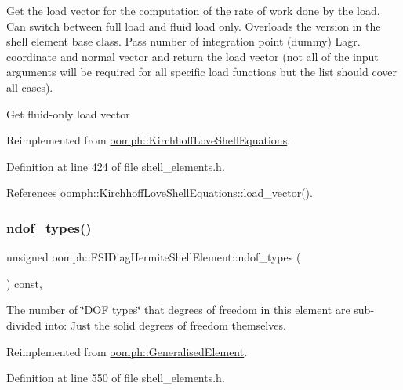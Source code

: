 Get the load vector for the computation of the rate of work done by the load. Can switch between full load and fluid load only. Overloads the version in the shell element base class. Pass number of integration point (dummy) Lagr. coordinate and normal vector and return the load vector (not all of the input arguments will be required for all specific load functions but the list should cover all cases). 

Get fluid-\/only load vector 

Reimplemented from \hyperlink{classoomph_1_1KirchhoffLoveShellEquations_ae565dc5fcdf60d733f6d19361e88d22d}{oomph\+::\+Kirchhoff\+Love\+Shell\+Equations}.



Definition at line 424 of file shell\+\_\+elements.\+h.



References oomph\+::\+Kirchhoff\+Love\+Shell\+Equations\+::load\+\_\+vector().

\mbox{\label{classoomph_1_1FSIDiagHermiteShellElement_aa190107f807910bf4e9d5a7e333d97a2}} 
\subsubsection{\texorpdfstring{ndof\+\_\+types()}{ndof\_types()}}
{\footnotesize\ttfamily unsigned oomph\+::\+F\+S\+I\+Diag\+Hermite\+Shell\+Element\+::ndof\+\_\+types (\begin{DoxyParamCaption}{ }\end{DoxyParamCaption}) const\hspace{0.3cm}{\ttfamily [inline]}, {\ttfamily [virtual]}}



The number of \char`\"{}\+D\+O\+F types\char`\"{} that degrees of freedom in this element are sub-\/divided into\+: Just the solid degrees of freedom themselves. 



Reimplemented from \hyperlink{classoomph_1_1GeneralisedElement_a0c6037a870597b35dcf1c780710b9a56}{oomph\+::\+Generalised\+Element}.



Definition at line 550 of file shell\+\_\+elements.\+h.



